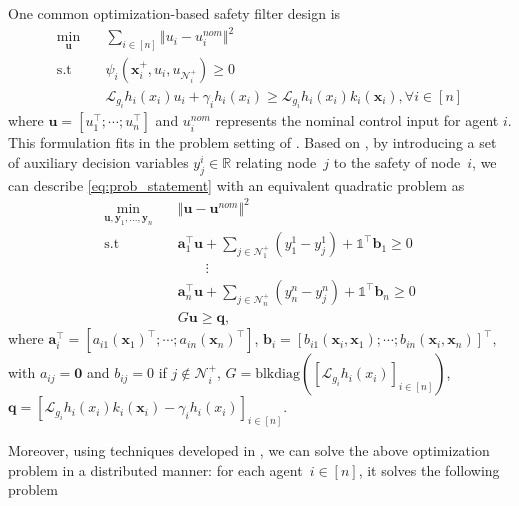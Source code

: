 \documentclass[letterpaper, 10 pt, conference]{ieeeconf}  %
\theoremstyle{plain}
\begin{document}
 One common optimization-based safety filter design is 
\begin{equation} \label{eq:prob_statement}
    \begin{aligned}
        \min_{\mathbf{u}} & \quad \sum_{i \in [n]}  \Vert u_i - u_{i}^{nom} \Vert^2 \\
         \text{s.t} & \quad \psi_i(\mathbf{x}_i^+,u_i,u_{\mathcal{N}_i^+}) \geq 0 \\
         & \quad
         \mathcal{L}_{g_i}h_i(x_i) u_i +  \gamma_i h_i(x_i) \geq \mathcal{L}_{g_i}h_i(x_i) k_i(\mathbf{x}_i) , 
         \forall i \in [n]
    \end{aligned}
\end{equation}
where $\mathbf{u} = [u_{1}^\top; \cdots ;u_{n}^\top]$ and $u_i^{nom}$ represents the nominal control input for agent $i$. This formulation fits in the problem setting of \cite{xiao2025continuous}. Based on \cite[Proposition~1]{xiao2025continuous}, by introducing a set of auxiliary decision variables $y_j^i \in \mathbb{R}$ relating node~$j$ to the safety of node~$i$, we can describe \eqref{eq:prob_statement} with an equivalent quadratic problem as 
\begin{equation} \label{eq:prob_statement_aux_var}
    \begin{aligned}
        \min_{\mathbf{u}, \mathbf{y}_1, \dots, \mathbf{y}_n} & \quad \Vert \mathbf{u} - \mathbf{u}^{nom} \Vert^2 \\
         \text{s.t} & \quad \mathbf{a}_1^\top \mathbf{u}  + \sum_{j \in \mathcal{N}_1^+} (y_1^1 - y_j^1) + \mathbb{1}^\top \mathbf{b}_{1} \geq 0 \\
         & \quad \quad \quad \vdots \\
         & \quad 
         \mathbf{a}_n^\top \mathbf{u}  + \sum_{j \in \mathcal{N}_n^+} (y_n^n - y_j^n) +  \mathbb{1}^\top \mathbf{b}_{n} \geq 0 \\
         & \quad G \mathbf{u} \geq \mathbf{q},
    \end{aligned}
\end{equation}
where $\mathbf{a}_i^\top = [a_{i1}(\mathbf{x}_1)^\top; \cdots ;a_{in}(\mathbf{x}_n)^\top]$, $\mathbf{b}_{i} = [b_{i1}(\mathbf{x}_i,\mathbf{x}_1); \cdots ; b_{in}(\mathbf{x}_i,\mathbf{x}_n)]^\top$, with $a_{ij} = \mathbf{0}$ and $b_{ij} = 0$ if $j \notin \mathcal{N}_i^+$, $G = \text{blkdiag}([\mathcal{L}_{g_i}h_i(x_i)]_{i \in [n]})$, $\mathbf{q} = [\mathcal{L}_{g_i}h_i(x_i) k_i(\mathbf{x}_i)-\gamma_i h_i(x_i)]_{i \in [n]}$.

Moreover, using techniques developed in \cite{xiao2025continuous}, we can solve the above optimization problem in a distributed manner: for   each agent~$i \in [n]$, it solves the following problem
\end{document}
